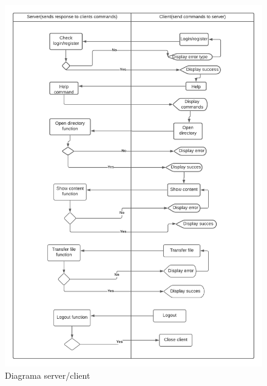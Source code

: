 \documentclass[runningheads]{llncs}
\begin{document}
\begin{figure}[H]
    \centering
    \includegraphics[width=13cm]{functions.png}
    \caption{Diagrama server/client}
\end{figure}


\newpage
\end{document}
